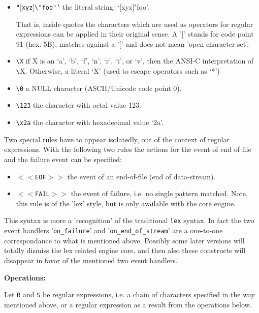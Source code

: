 \begin{itemize}
\item {\tt "$[$xyz$]$\verb|\|"foo"'} the literal string: `$[$xyz$]$"foo'.
    
     That is, inside quotes the characters which are used as operators for
     regular expressions can be applied in their original sense. A '$[$'
     stands for code point 91 (hex. 5B), matches against a '$[$' and does
     not mean 'open character set'.     
	  
\item {\tt \verb|\|X}
     if X is an `a', `b', `f', `n', `r', `t', or `v', then the ANSI-C
     interpretation of \verb|\|X.  Otherwise, a literal `X' (used to escape
     operators such as `*')

\item {\tt \verb|\|0} a NULL character (ASCII/Unicode code point 0).

\item {\tt \verb|\|123} the character with octal value 123.

\item {\tt \verb|\|x2a} the character with hexadecimal value `2a'.
\end{itemize}

Two special rules have to appear isolatedly, out of the context of regular
expressions. With the following two rules the actions for the event of 
end of file and the failure event can be specified:

\begin{itemize}

\item {\tt $<<$EOF$>>$} the event of an end-of-file (end of data-stream). 

\item {\tt $<<$FAIL$>>$} the event of failure, i.e. no single pattern matched. 
    Note, this rule is of the 'lex' style, but is only available with the 
    {\quex} core engine.

\end{itemize}

This syntax is more a 'recognition' of the traditional {\tt lex} syntax. In fact
    the two event handlers '{\tt on\_failure}' and '{\tt on\_end\_of\_stream}' are
    a one-to-one correspondance to what is mentioned above. Possibly some later
    versions will totally dismiss the lex related engine core, and then also
    these constructs will disappear in favor of the mentioned two event handlers.

{\bf Operations:}     

Let {\tt R} and {\tt S} be regular expressions, i.e. a chain of characters specified in the
way mentioned above, or a regular expression as a result from the operations below.
     
